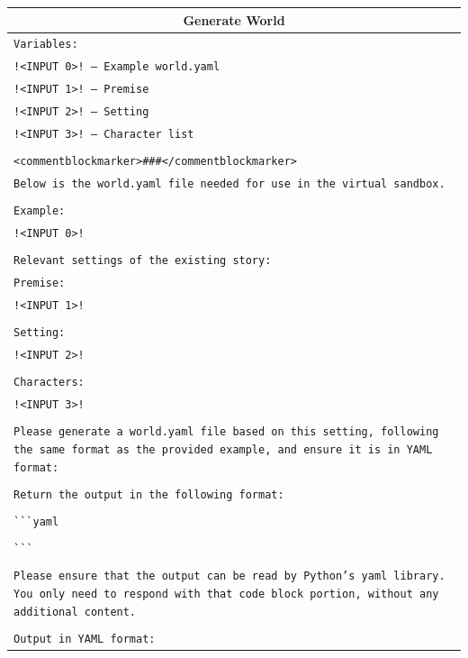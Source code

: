 \documentclass[letterpaper]{article} %
\begin{document}
\begin{small}
  \begin{longtable}{p{\textwidth}}
    \toprule
    \multicolumn{1}{c}{\textbf{Generate World}} \\
    \midrule

    \texttt{Variables:} \\
    \texttt{!<INPUT 0>! -- Example world.yaml} \\
    \texttt{!<INPUT 1>! -- Premise} \\
    \texttt{!<INPUT 2>! -- Setting} \\
    \texttt{!<INPUT 3>! -- Character list} \\
    \\
    \texttt{<commentblockmarker>\#\#\#</commentblockmarker>} \\
    \texttt{Below is the world.yaml file needed for use in the virtual sandbox.} \\
    \\
    \texttt{Example:} \\
    \texttt{!<INPUT 0>!} \\
    \\
    \texttt{Relevant settings of the existing story:} \\
    \texttt{Premise:} \\
    \texttt{!<INPUT 1>!} \\
    \\
    \texttt{Setting:} \\
    \texttt{!<INPUT 2>!} \\
    \\
    \texttt{Characters:} \\
    \texttt{!<INPUT 3>!} \\
    \\
    \texttt{Please generate a world.yaml file based on this setting, following the same format as the provided example, and ensure it is in YAML format:} \\
    \\
    \texttt{Return the output in the following format:} \\
    \\
    \verb|```|\texttt{yaml} \\
    \\
    \verb|```| \\
    \\
    \texttt{Please ensure that the output can be read by Python's yaml library. You only need to respond with that code block portion, without any additional content.} \\
    \\
    \texttt{Output in YAML format:} \\
    \midrule


\end{longtable}
\end{small}
\end{document}
